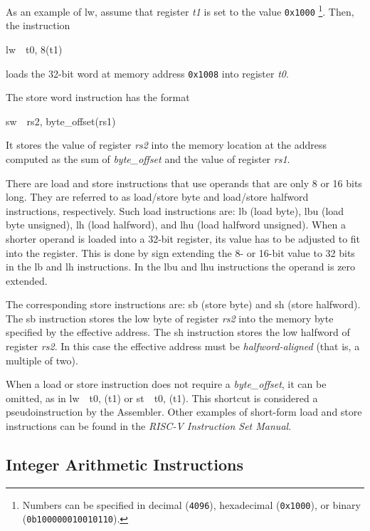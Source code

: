\documentclass[11pt, twoside, pdftex]{article}
\begin{document}
As an example of {\sf lw}, assume that register {\it t1} is set to the 
value \texttt{0x1000} \footnote{Numbers can be 
specified in decimal (\texttt{4096}), hexadecimal (\texttt{0x1000}), or binary 
(\texttt{0b100000010010110}).}.  Then, the instruction
\vspace{-\baselineskip}
\begin{center}
{\sf lw~~t0, 8(t1)}
\end{center}
\noindent
loads the 32-bit word at memory address \texttt{0x1008} into register {\it t0}.

The store word instruction has the format
\vspace{-\baselineskip}
\begin{center}
{\sf sw~~rs2, byte\_offset(rs1)}
\end{center}
\noindent 
It stores the value of register {\it rs2} into the memory location at the address
computed as the sum of {\it byte\_offset} and the value of register {\it rs1}. 
 
There are load and store instructions that use operands that are only 8 or 16 bits long.
They are referred to as load/store byte and load/store halfword instructions, respectively.
Such load instructions are: {\sf lb} (load byte), {\sf lbu} (load byte unsigned),
{\sf lh} (load halfword), and {\sf lhu} (load halfword unsigned). 
When a shorter operand is loaded into a 32-bit register, its value has to be adjusted
to fit into the register. This is done by sign extending the 8- or 16-bit value to 32 bits
in the {\sf lb} and {\sf lh} instructions. In the {\sf lbu} and {\sf lhu} instructions
the operand is zero extended.

The corresponding store instructions are: {\sf sb} (store byte) and {\sf sh} (store halfword).
The {\sf sb} instruction stores the low byte of register {\it rs2} into the memory byte
specified by the effective address. The {\sf sh} instruction stores the low halfword
of register {\it rs2}. In this case the effective address must be {\it halfword-aligned}
(that is, a multiple of two).

When a load or store instruction does not require a {\it byte\_offset}, it can be omitted,
as in {\sf lw~~t0, (t1)} or {\sf st~~t0, (t1)}. This shortcut is considered a
pseudoinstruction by the Assembler. Other examples of short-form load and store
instructions can be found in the {\it RISC-V Instruction Set Manual}.

\subsection{Integer Arithmetic Instructions}
\end{document}
